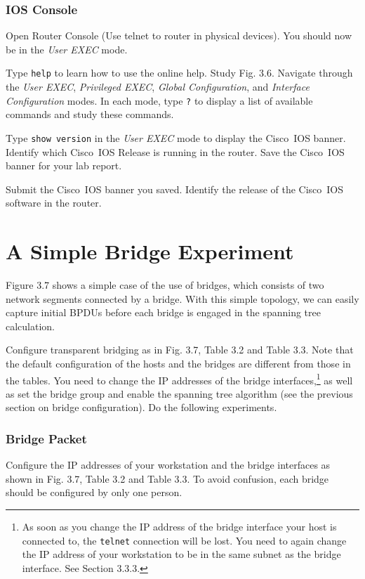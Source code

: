 \documentclass{../UTNetLab}
\begin{document}
\section{IOS Console}
    Open Router Console (Use telnet to router in physical devices).
    You should now be in the \textit{User EXEC} mode.

    Type \lstinline[language={cisco}]{help} to learn how to use the online help.
    Study Fig. 3.6. Navigate through the \textit{User EXEC}, \textit{Privileged EXEC}, \textit{Global Configuration}, and \textit{Interface Configuration} modes. In each mode, type \lstinline[language={cisco}]{?} to display a list of available commands and study these commands.

    Type \lstinline[language={cisco}]{show version} in the \textit{User EXEC} mode to display the Cisco~IOS banner.
    Identify which Cisco~IOS Release is running in the router.
    Save the Cisco~IOS banner for your lab report.
    
    \begin{report}
    \item Submit the Cisco~IOS banner you saved.
    Identify the release of the Cisco~IOS software in the router.
    \end{report}

\part{A Simple Bridge Experiment}
    Figure 3.7 shows a simple case of the use of bridges, which consists of two network segments connected by a bridge.
    With this simple topology, we can easily capture initial BPDUs before each bridge is engaged in the spanning tree calculation.

    Configure transparent bridging as in Fig.
    3.7, Table 3.2 and Table 3.3.
    Note that the default configuration of the hosts and the bridges are different from those in the tables.
    You need to change the IP addresses of the bridge interfaces,\footnote{As soon as you change the IP address of the bridge interface your host is connected to, the \lstinline{telnet} connection will be lost.
    You need to again change the IP address of your workstation to be in the same subnet as the bridge interface. See Section 3.3.3.} as well as set the bridge group and enable the spanning tree algorithm (see the previous section on bridge configuration).
    Do the following experiments.

\section{Bridge Packet}
    Configure the IP addresses of your workstation and the bridge interfaces as shown in Fig. 3.7, Table 3.2 and Table 3.3.
    To avoid confusion, each bridge should be configured by only one person.
\end{document}
